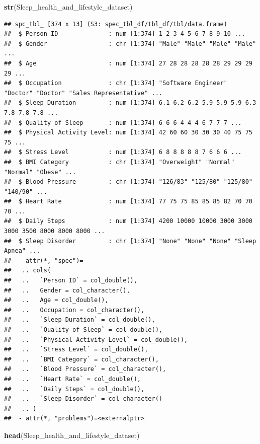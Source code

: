 \documentclass[
  11pt,
]{article}
\newenvironment{Shaded}{\begin{snugshade}}{\end{snugshade}}
\newcommand{\FunctionTok}[1]{\textcolor[rgb]{0.13,0.29,0.53}{\textbf{#1}}}
\newcommand{\NormalTok}[1]{#1}
\begin{document}
\begin{Shaded}
\begin{Highlighting}[]
\FunctionTok{str}\NormalTok{(Sleep\_health\_and\_lifestyle\_dataset)}
\end{Highlighting}
\end{Shaded}

\begin{verbatim}
## spc_tbl_ [374 x 13] (S3: spec_tbl_df/tbl_df/tbl/data.frame)
##  $ Person ID              : num [1:374] 1 2 3 4 5 6 7 8 9 10 ...
##  $ Gender                 : chr [1:374] "Male" "Male" "Male" "Male" ...
##  $ Age                    : num [1:374] 27 28 28 28 28 28 29 29 29 29 ...
##  $ Occupation             : chr [1:374] "Software Engineer" "Doctor" "Doctor" "Sales Representative" ...
##  $ Sleep Duration         : num [1:374] 6.1 6.2 6.2 5.9 5.9 5.9 6.3 7.8 7.8 7.8 ...
##  $ Quality of Sleep       : num [1:374] 6 6 6 4 4 4 6 7 7 7 ...
##  $ Physical Activity Level: num [1:374] 42 60 60 30 30 30 40 75 75 75 ...
##  $ Stress Level           : num [1:374] 6 8 8 8 8 8 7 6 6 6 ...
##  $ BMI Category           : chr [1:374] "Overweight" "Normal" "Normal" "Obese" ...
##  $ Blood Pressure         : chr [1:374] "126/83" "125/80" "125/80" "140/90" ...
##  $ Heart Rate             : num [1:374] 77 75 75 85 85 85 82 70 70 70 ...
##  $ Daily Steps            : num [1:374] 4200 10000 10000 3000 3000 3000 3500 8000 8000 8000 ...
##  $ Sleep Disorder         : chr [1:374] "None" "None" "None" "Sleep Apnea" ...
##  - attr(*, "spec")=
##   .. cols(
##   ..   `Person ID` = col_double(),
##   ..   Gender = col_character(),
##   ..   Age = col_double(),
##   ..   Occupation = col_character(),
##   ..   `Sleep Duration` = col_double(),
##   ..   `Quality of Sleep` = col_double(),
##   ..   `Physical Activity Level` = col_double(),
##   ..   `Stress Level` = col_double(),
##   ..   `BMI Category` = col_character(),
##   ..   `Blood Pressure` = col_character(),
##   ..   `Heart Rate` = col_double(),
##   ..   `Daily Steps` = col_double(),
##   ..   `Sleep Disorder` = col_character()
##   .. )
##  - attr(*, "problems")=<externalptr>
\end{verbatim}

\begin{Shaded}
\begin{Highlighting}[]
\FunctionTok{head}\NormalTok{(Sleep\_health\_and\_lifestyle\_dataset)}
\end{Highlighting}
\end{Shaded}
\end{document}
